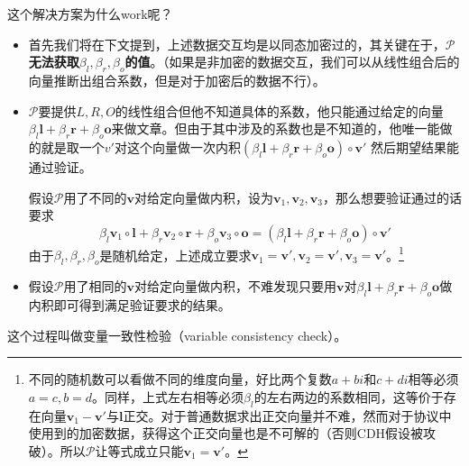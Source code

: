 \documentclass[12pt]{article}
\newcommand{\pp}{$\mathcal{P}$}
\begin{document}
这个解决方案为什么work呢？
\begin{itemize}
	\item 首先我们将在下文提到，上述数据交互均是以同态加密过的，其关键在于，\textbf{\pp 无法获取$\beta_l,\beta_r,\beta_o$的值}。（如果是非加密的数据交互，我们可以从线性组合后的向量推断出组合系数，但是对于加密后的数据不行）。
	\item \pp 要提供$L,R,O$的线性组合但他不知道具体的系数，他只能通过给定的向量$\beta_l\bm{l}+\beta_r\bm{r}+\beta_o\bm{o}$来做文章。但由于其中涉及的系数也是不知道的，他唯一能做的就是取一个$v'$对这个向量做一次内积$(\beta_l\bm{l}+\beta_r\bm{r}+\beta_o\bm{o})\circ \bm{v}'$ 然后期望结果能通过验证。

	假设\pp 用了不同的$\bm{v}$对给定向量做内积，设为$\bm{v}_1,\bm{v}_2,\bm{v}_3$，那么想要验证通过的话要求
	$$ \beta_l \bm{v}_1\circ \bm{l}+\beta_r \bm{v}_2\circ \bm{r}+\beta_o \bm{v}_3\circ \bm{o} = (\beta_l\bm{l}+\beta_r\bm{r}+\beta_o\bm{o})\circ \bm{v}'$$
	由于$\beta_l,\beta_r,\beta_o$是随机给定，上述成立要求$ \bm{v}_1=\bm{v}', \bm{v}_2=\bm{v}',\bm{v}_3=\bm{v}'$。\footnote{不同的随机数可以看做不同的维度向量，好比两个复数$a+bi$和$c+di$相等必须$a=c,b=d$。同样，上式左右相等必须$\beta_l$的左右两边的系数相同，这等价于存在向量$\bm{v}_1-\bm{v}'$与$\bm{l}$正交。对于普通数据求出正交向量并不难，然而对于协议中使用到的加密数据，获得这个正交向量也是不可解的（否则CDH假设被攻破）。所以\pp 让等式成立只能$\bm{v}_1=\bm{v}'$。}
	\item  假设\pp 用了相同的$\bm{v}$对给定向量做内积，不难发现只要用$\bm{v}$对$\beta_l\bm{l}+\beta_r\bm{r}+\beta_o\bm{o}$做内积即可得到满足验证要求的结果。
\end{itemize}
这个过程叫做变量一致性检验（variable consistency check）。
\end{document}
